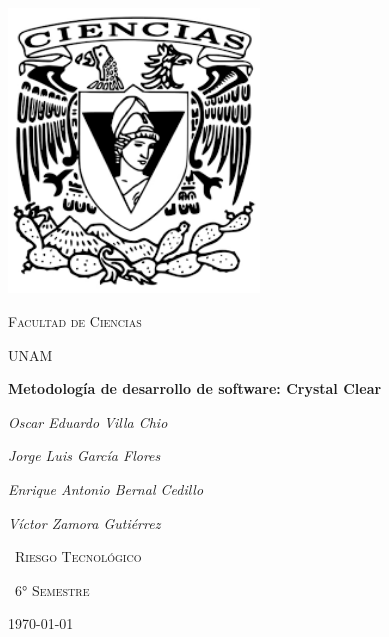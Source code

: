 \documentclass[12pt,a4paper]{report}
\begin{document}
\begin{titlepage}
	\centering
	\includegraphics[width=0.5\textwidth]{./images/logo_ciencias}\par\vspace{1cm}
	{\scshape\LARGE Facultad de Ciencias \par}
	{\scshape\LARGE UNAM \par}
	\vspace{1cm}
	{\huge\bfseries Metodolog\'ia de desarrollo de software: Crystal Clear\par}
	\vspace{2cm}
	{\Large\itshape Oscar Eduardo Villa Chio\par}
	{\Large\itshape Jorge Luis Garc\'ia Flores\par}
	{\Large\itshape Enrique Antonio Bernal Cedillo\par}
	{\Large\itshape V\'ictor Zamora Guti\'errez\par}
	\vspace{2cm}
	{\scshape\ Riesgo Tecnol\'ogico \par}
	{\scshape\ 6° Semestre\par}

	{\large \today\par}
\end{titlepage}
\end{document}
